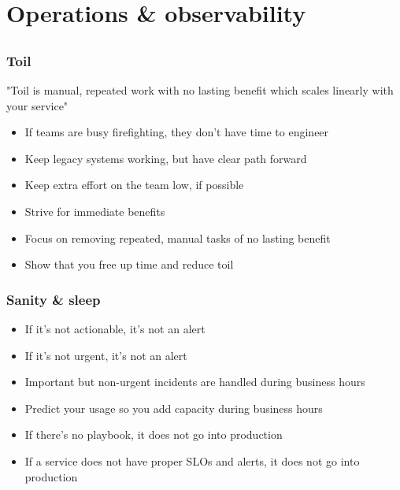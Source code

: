 \documentclass[aspectratio=169]{beamer}
\begin{document}


\section{Operations \& observability}

\subsection{}

\begin{frame}
	\frametitle{Toil}
	"Toil is manual, repeated work with no lasting benefit which scales linearly with your service"
	\vfill
	\begin{itemize}
		\item If teams are busy firefighting, they don't have time to engineer
		\item Keep legacy systems working, but have clear path forward
		\item Keep extra effort on the team low, if possible
		\item Strive for immediate benefits
		\item Focus on removing repeated, manual tasks of no lasting benefit
		\item Show that you free up time and reduce toil
	\end{itemize}
	\vfill
\end{frame}

\begin{frame}
	\frametitle{Sanity \& sleep}
	\begin{itemize}
		\item If it's not actionable, it's not an alert
		\item If it's not urgent, it's not an alert
		\item Important but non-urgent incidents are handled during business hours
		\item Predict your usage so you add capacity during business hours
		\item If there's no playbook, it does not go into production
		\item If a service does not have proper SLOs and alerts, it does not go into production
	\end{itemize}
\end{frame}
\end{document}
